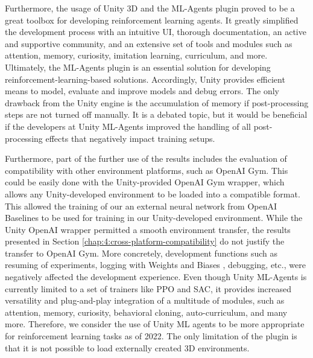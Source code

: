     
    Furthermore, the usage of Unity 3D and the ML-Agents plugin proved to be a great toolbox for developing reinforcement learning agents. It greatly simplified the development process with an intuitive UI, thorough documentation, an active and supportive community, and an extensive set of tools and modules such as attention, memory, curiosity, imitation learning, curriculum, and more.
     Ultimately, the ML-Agents plugin is an essential solution for developing reinforcement-learning-based solutions. Accordingly, Unity provides efficient means to model, evaluate and improve models and debug errors. The only drawback from the Unity engine is the accumulation of memory if post-processing steps are not turned off manually. It is a debated topic, but it would be beneficial if the developers at Unity ML-Agents improved the handling of all post-processing effects that negatively impact training setups.
     
    Furthermore, part of the further use of the results includes the evaluation of compatibility with other environment platforms, such as OpenAI Gym. 
    This could be easily done with the Unity-provided OpenAI Gym wrapper, which allows any Unity-developed environment to be loaded into a compatible format.
    This allowed the training of our an external neural network from OpenAI Baselines \cite{github-dlr-rm-baselines3} to be used for training in our Unity-developed environment. While the Unity OpenAI wrapper permitted a smooth environment transfer, the results presented in Section \ref{chap:4:cross-platform-compatibility} do not justify the transfer to OpenAI Gym. 
    More concretely, development functions such as resuming of experiments, logging with Weights and Biases \cite{wandb2022}, debugging, etc., were negatively affected the development experience. 
    Even though Unity ML-Agents is currently limited to a set of trainers like PPO and SAC, it provides increased versatility and plug-and-play integration of a multitude of modules, such as attention, memory, curiosity, behavioral cloning, auto-curriculum, and many more. Therefore, we consider the use of Unity ML agents to be more appropriate for reinforcement learning tasks as of 2022. The only limitation of the plugin is that it is not possible to load externally created 3D environments.


